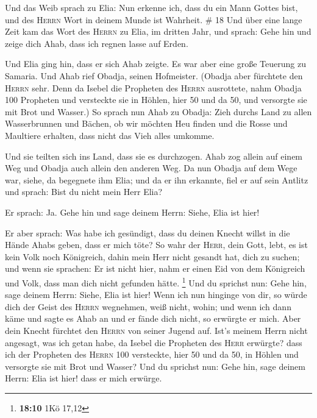  Und das Weib sprach zu Elia: Nun erkenne ich, dass du
ein Mann Gottes bist, und des \textsc{Herrn} Wort in deinem Munde ist
Wahrheit. \# 18  Und über eine lange Zeit kam das Wort des
\textsc{Herrn} zu Elia, im dritten Jahr, und sprach: Gehe hin und zeige
dich Ahab, dass ich regnen lasse auf Erden.

 Und Elia ging hin, dass er sich Ahab zeigte. Es war aber
eine große Teuerung zu Samaria.  Und Ahab rief Obadja,
seinen Hofmeister. (Obadja aber fürchtete den \textsc{Herrn} sehr.
 Denn da Isebel die Propheten des \textsc{Herrn}
ausrottete, nahm Obadja 100 Propheten und versteckte sie in Höhlen, hier
50 und da 50, und versorgte sie mit Brot und Wasser.)  So
sprach nun Ahab zu Obadja: Zieh durchs Land zu allen Wasserbrunnen und
Bächen, ob wir möchten Heu finden und die Rosse und Maultiere erhalten,
dass nicht das Vieh alles umkomme.

 Und sie teilten sich ins Land, dass sie es durchzogen.
Ahab zog allein auf einem Weg und Obadja auch allein den anderen Weg.
 Da nun Obadja auf dem Wege war, siehe, da begegnete ihm
Elia; und da er ihn erkannte, fiel er auf sein Antlitz und sprach: Bist
du nicht mein Herr Elia?

 Er sprach: Ja. Gehe hin und sage deinem Herrn: Siehe,
Elia ist hier!

 Er aber sprach: Was habe ich gesündigt, dass du deinen
Knecht willst in die Hände Ahabs geben, dass er mich töte?
 So wahr der \textsc{Herr}, dein Gott, lebt, es ist kein
Volk noch Königreich, dahin mein Herr nicht gesandt hat, dich zu suchen;
und wenn sie sprachen: Er ist nicht hier, nahm er einen Eid von dem
Königreich und Volk, dass man dich nicht gefunden hätte. \footnote{\textbf{18:10}
  1Kö 17,12}  Und du sprichst nun: Gehe hin, sage deinem
Herrn: Siehe, Elia ist hier!  Wenn ich nun hinginge von
dir, so würde dich der Geist des \textsc{Herrn} wegnehmen, weiß nicht,
wohin; und wenn ich dann käme und sagte es Ahab an und er fände dich
nicht, so erwürgte er mich. Aber dein Knecht fürchtet den \textsc{Herrn}
von seiner Jugend auf.  Ist's meinem Herrn nicht
angesagt, was ich getan habe, da Isebel die Propheten des \textsc{Herr}
erwürgte? dass ich der Propheten des \textsc{Herrn} 100 versteckte, hier
50 und da 50, in Höhlen und versorgte sie mit Brot und Wasser?
 Und du sprichst nun: Gehe hin, sage deinem Herrn: Elia
ist hier! dass er mich erwürge.

